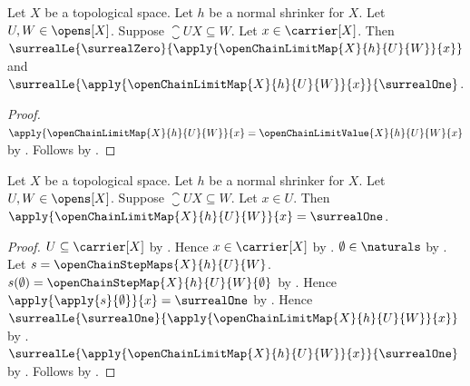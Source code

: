 \begin{corollary}\label{open_chain_limit_map_between_zero_and_one}
    Let $X$ be a topological space.
    Let $h$ be a normal shrinker for $X$.
    Let $U,W\in\opens[X]$.
    Suppose $\closure{U}{X}\subseteq W$.
    Let $x\in\carrier[X]$.
    Then
        $\surrealLe{\surrealZero}
            {\apply{\openChainLimitMap{X}{h}{U}{W}}{x}}$ and
        $\surrealLe{\apply{\openChainLimitMap{X}{h}{U}{W}}{x}}
            {\surrealOne}$.
\end{corollary}
\begin{proof}
    $\apply{\openChainLimitMap{X}{h}{U}{W}}{x}
        =\openChainLimitValue{X}{h}{U}{W}{x}$
        by .
    Follows by .
\end{proof}

\begin{proposition}\label{open_chain_limit_map_one_on_first}
    Let $X$ be a topological space.
    Let $h$ be a normal shrinker for $X$.
    Let $U,W\in\opens[X]$.
    Suppose $\closure{U}{X}\subseteq W$.
    Let $x\in U$.
    Then $\apply{\openChainLimitMap{X}{h}{U}{W}}{x}=\surrealOne$.
\end{proposition}
\begin{proof}
    $U\subseteq\carrier[X]$ by .
    Hence $x\in\carrier[X]$ by .
    $\emptyset\in\naturals$ by .
    Let $s=\openChainStepMaps{X}{h}{U}{W}$.
    $s(\emptyset)=\openChainStepMap{X}{h}{U}{W}{\emptyset}$
        by .
    Hence $\apply{\apply{s}{\emptyset}}{x}=\surrealOne$
        by .
    Hence $\surrealLe{\surrealOne}
        {\apply{\openChainLimitMap{X}{h}{U}{W}}{x}}$
        by .
    $\surrealLe{\apply{\openChainLimitMap{X}{h}{U}{W}}{x}}
        {\surrealOne}$
        by .
    Follows by
        .
\end{proof}

